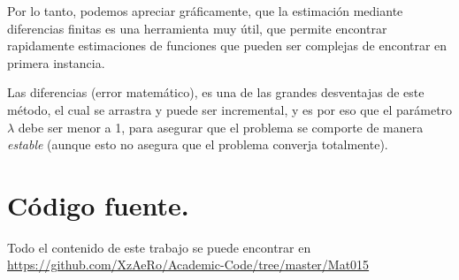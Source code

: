 \documentclass[12pt,letterpaper]{article}
\begin{document}
Por lo tanto, podemos apreciar gráficamente, que la estimación mediante diferencias finitas es una herramienta muy útil, que permite encontrar rapidamente estimaciones de funciones que pueden ser complejas de encontrar en primera instancia.

Las diferencias (error matemático), es una de las grandes desventajas de este método, el cual se arrastra y puede ser incremental, y es por eso que el parámetro $\lambda$ debe ser menor a 1, para asegurar que el problema se comporte de manera \textit{estable} (aunque esto no asegura que el problema converja totalmente).

\section{Código fuente.}

Todo el contenido de este trabajo se puede encontrar en \url{https://github.com/XzAeRo/Academic-Code/tree/master/Mat015}
\end{document}
